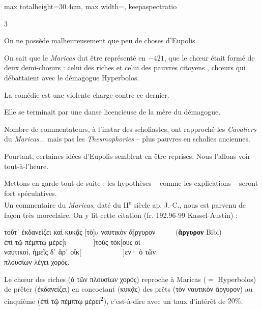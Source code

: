 \documentclass[11pt,twoside]{book}
\newcommand{\italique}[1]{\textit{#1}}
\newcommand{\citComm}[1]{\begin{quoting}[vskip=0.4pt,leftmargin=0.7em,rightmargin=0.2em]#1\end{quoting}}
\newcommand{\nieme}[1]{#1\textsuperscript{e}}
\newcommand{\douteux}[1]{$\underset{\cdot}{\text{#1}}$}
\newcommand{\marqueur}[1]{\textsuperscript{\color{rubricRed}\textbf{#1}}}
\begin{document}
\begin{adjustbox}{max totalheight=30.4cm, max width=\textwidth, keepaspectratio}
\begin{minipage}{\textwidth}
{\begin{multicols}{3}
\par\vspace{1.5pt}
\noindent On ne possède malheureusement que peu de choses d'Eupolis.
\par\vspace{1.5pt}
\noindent On sait que le \italique{Maricas} dut être représenté en $-421$, que le chœur était formé de deux demi-chœurs : celui des riches et celui des pauvres citoyens , chœurs qui débattaient avec le démagogue Hyperbolos.
\par\vspace{1.5pt}
\noindent La comédie est une violente charge contre ce dernier.
\par\vspace{1.5pt}
\noindent Elle se terminait par une danse licencieuse de la mère du démagogue.
\par\vspace{1.5pt}
\noindent Nombre de commentateurs, à l'instar des scholiastes, ont rapproché les \italique{Cavaliers} du \italique{Maricas}... mais pas les \italique{Thesmophories} -- plus pauvres en scholies anciennes.
\par\vspace{1.5pt}
\noindent Pourtant, certaines idées d'Eupolis semblent en être reprises. Nous l'allons voir tout-à-l'heure.
\par\vspace{1.5pt}
\noindent Mettons en garde tout-de-suite : les hypothèses -- comme les explications -- seront fort spéculatives.\\ Un commentaire du \italique{Maricas}, daté du \nieme{II} siècle ap. J.-C., nous est parvenu de façon très morcelaire. On y lit cette citation (fr. 192.96-99 Kassel-Austin) :
\citComm{τοῦτ᾽ ἐκδανείζει καὶ κυκᾷς [τὸ]\douteux{ν} ναυτικὸν \douteux{ἄ}[ργυρον \ \ \ \ \ (\textbf{ἄργυρον} Bibi)\\
ἐπὶ τῷ πέμπτῳ μέρε[ι \ \ \ \ \ \ \ ]τοὺς τόκ[ους οἱ\\
ναυτικοί, ἡμεῖς δ᾽ ἄρ᾽ οἴκ[ \ \ \ \ \ \ \ \ \ \ \ ]εν· ὁ τῶν\\
πλουσίων λέγει χορός.}
\par\vspace{1.5pt}
\noindent Le chœur des riches (ὁ τῶν πλουσίων χορός) reproche à Maricas ($=$ Hyperbolos) de prêter (ἐκδανείζει) en concoctant (κυκᾷς) des prêts (τὸν ναυτικὸν ἄργυρον) au cinquième (ἐπὶ τῷ πέμπτῳ μέρει\marqueur{2}), c'est-à-dire avec un taux d'intérêt de $20 \%$.
\par\vspace{1.5pt}

\end{multicols}}
\end{minipage}
\end{adjustbox}
\end{document}
